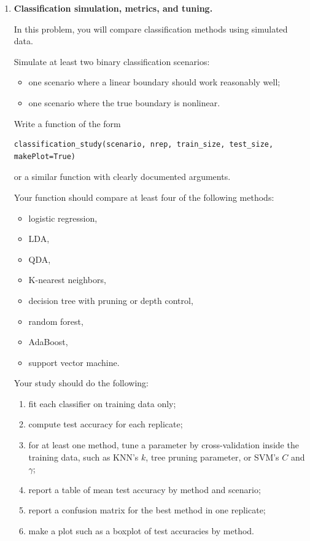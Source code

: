 \documentclass[11pt]{article}
\begin{document}
\begin{enumerate}
Your explanation should discuss what the lasso penalty does to coefficients, why standardization matters, and how the results illustrate the bias-variance tradeoff.

\newpage

\item \textbf{Classification simulation, metrics, and tuning.}

In this problem, you will compare classification methods using simulated data.

Simulate at least two binary classification scenarios:

\begin{itemize}
    \item one scenario where a linear boundary should work reasonably well;
    \item one scenario where the true boundary is nonlinear.
\end{itemize}

Write a function of the form

\begin{lstlisting}
classification_study(scenario, nrep, train_size, test_size, makePlot=True)
\end{lstlisting}

or a similar function with clearly documented arguments.

Your function should compare at least four of the following methods:

\begin{itemize}
    \item logistic regression,
    \item LDA,
    \item QDA,
    \item K-nearest neighbors,
    \item decision tree with pruning or depth control,
    \item random forest,
    \item AdaBoost,
    \item support vector machine.
\end{itemize}

Your study should do the following:

\begin{enumerate}[label=(\alph*)]
    \item fit each classifier on training data only;
    \item compute test accuracy for each replicate;
    \item for at least one method, tune a parameter by cross-validation inside the training data, such as KNN's \(k\), tree pruning parameter, or SVM's \(C\) and \(\gamma\);
    \item report a table of mean test accuracy by method and scenario;
    \item report a confusion matrix for the best method in one replicate;
    \item make a plot such as a boxplot of test accuracies by method.
\end{enumerate}


\end{enumerate}
\end{document}

